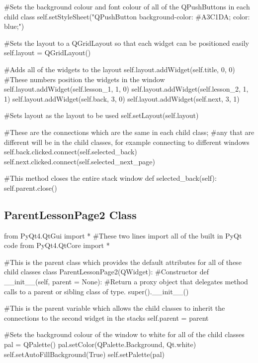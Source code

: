\begin{landscape}
\begin{python}
        #Sets the background colour and font colour of all of the QPushButtons in each child class
        self.setStyleSheet("QPushButton {background-color: #A3C1DA; color: blue;}")

        #Sets the layout to a QGridLayout so that each widget can be positioned easily
        self.layout = QGridLayout()

        #Adds all of the widgets to the layout
        self.layout.addWidget(self.title, 0, 0) #These numbers position the widgets in the window
        self.layout.addWidget(self.lesson_1, 1, 0)
        self.layout.addWidget(self.lesson_2, 1, 1)
        self.layout.addWidget(self.back, 3, 0)
        self.layout.addWidget(self.next, 3, 1)

        #Sets layout as the layout to be used
        self.setLayout(self.layout)

        #These are the connections which are the same in each child class;
        #any that are different will be in the child classes, for example connecting to different windows
        self.back.clicked.connect(self.selected_back)
        self.next.clicked.connect(self.selected_next_page)

    #This method closes the entire stack window
    def selected_back(self):
        self.parent.close()
\end{python}

\subsection{ParentLessonPage2 Class}

\begin{python}
from PyQt4.QtGui import * #These two lines import all of the built in PyQt code
from PyQt4.QtCore import *

#This is the parent class which provides the default attributes for all of these child classes
class ParentLessonPage2(QWidget):
    #Constructor
    def __init__(self, parent = None):
        #Return a proxy object that delegates method calls to a parent or sibling class of type.
        super().__init__()

        #This is the parent variable which allows the child classes to inherit the connections to the second widget in the stacks       
        self.parent = parent

        #Sets the background colour of the window to white for all of the child classes
        pal = QPalette()
        pal.setColor(QPalette.Background, Qt.white)
        self.setAutoFillBackground(True)
        self.setPalette(pal)


\end{python}
\end{landscape}

